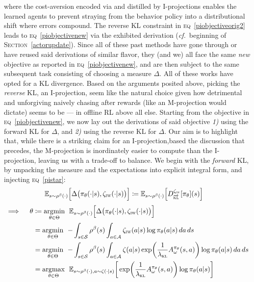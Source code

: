 where the cost-aversion encoded via and distilled by I-projections
enables the learned agents to prevent straying from the
behavior policy into a distributional shift where errors compound.
The reverse KL constraint in \textsc{eq}~\ref{piobjectiveorig2} leads to \textsc{eq}~\ref{piobjectivenew}
via the exhibited derivation (\textit{cf.}~beginning of \textsc{Section}~\ref{actorupdate}).
Since all of these past methods have gone through or have reused said derivations of similar flavor,
they (and we) all face the same \emph{new} objective as reported in \textsc{eq}~\ref{piobjectivenew}, and
are then subject to the same subsequent task consisting of choosing a measure $\Delta$.
All of these works have opted for a KL divergence.
Based on the arguments posited above, picking the \emph{reverse} KL, an I-projection, seem like the natural
choice given how detrimental and unforgiving naively chasing after rewards
(like an M-projection would dictate)
seems to be --- in offline RL above all else.
Starting from the objective in \textsc{eq}~\ref{piobjectivenew}, we now lay out the derivations
of said objective \textit{1)} using the forward KL for $\Delta$, and \textit{2)} using the reverse KL for $\Delta$.
Our aim is to highlight that, while there is a striking claim for an I-projection,based the discussion that precedes,
the M-projection is inordinately easier to compute than the I-projection, leaving us with a trade-off to balance.
We begin with the \emph{forward} KL, by unpacking the measure and the expectations into explicit integral form,
and injecting \textsc{eq}~\ref{pistar}:
\begin{align}
  \mathbb{E}_{s \sim \rho^\beta(\cdot)}
  \Big[
  \Delta\big(\pi_\theta(\cdot | s), \zeta_\textsc{iw}(\cdot | s)\big)
  \Big]
  &\coloneqq
  \mathbb{E}_{s \sim \rho^\beta(\cdot)}
  \Big[
  D^{\zeta_\textsc{iw}}_{\overrightarrow{\textsc{kl}}}[\pi_\theta](s)
  \Big]
  \label{mprojection}
\end{align}
\begin{align}
  \implies \quad
  \theta &\coloneqq
  \operatorname*{\arg\!\min}_{\theta \in \Theta} \;\,
  \mathbb{E}_{s \sim \rho^\beta(\cdot)}
  \Big[
  \Delta\big(\pi_\theta(\cdot | s), \zeta_\textsc{iw}(\cdot | s)\big)
  \Big]
  \\
  &= \operatorname*{\arg\!\min}_{\theta \in \Theta} \;\,
  - \int_{s \in \mathcal{S}} \rho^\beta(s) \int_{a \in \mathcal{A}}
  \zeta_\textsc{iw}(a | s)
  \log \pi_\theta(a | s) \, da \, ds \\
  &= \operatorname*{\arg\!\min}_{\theta \in \Theta} \;\,
  - \int_{s \in \mathcal{S}} \rho^\beta(s) \int_{a \in \mathcal{A}}
  \zeta(a | s) \exp (\frac{1}{\lambda_\textsc{kl}} A^{\pi_\theta}_\omega(s,a))
  \log \pi_\theta(a | s) \, da \, ds \\
  &= \operatorname*{\arg\!\max}_{\theta \in \Theta} \;\,
  \mathbb{E}_{s \sim \rho^\beta(\cdot), a \sim \zeta(\cdot | s)}
  \bigg[
  \exp (\frac{1}{\lambda_\textsc{kl}} A^{\pi_\theta}_\omega(s,a)) \log \pi_\theta(a | s)
  \bigg]
  \label{mprojectionargmin}
\end{align}

